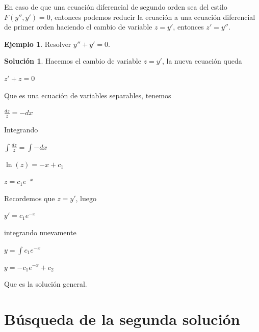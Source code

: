\documentclass{article}
\theoremstyle{plain}
\theoremstyle{definition}
\newtheorem{ejem}[thm]{Ejemplo}
\newtheorem{sol}[thm]{Solución}
\begin{document}
En caso de que una ecuación diferencial de segundo orden sea del estilo $F(y'',y')=0$, entonces podemos reducir la ecuación a una ecuación diferencial de primer orden haciendo el cambio de variable $z=y'$, entonces $z'=y''$.\\

\begin{ejem}Resolver $y''+y'=0$. \\
\end{ejem}

\begin{sol}Hacemos el cambio de variable $z=y'$, la nueva ecuación queda
\end{sol}

\begin{center}
$z'+z = 0$
\end{center}

Que es una ecuación de variables separables, tenemos

\begin{center}
$\displaystyle \frac{dz}{z} = -dx$
\end{center}

Integrando

\begin{center}
$\displaystyle  \int \frac{dz}{z} = \int -dx$
\end{center}


\begin{center}
$\displaystyle \ln(z) = -x +c_1$
\end{center}

\begin{center}
$\displaystyle z = c_1 e^{-x}$
\end{center}

Recordemos que $z= y'$, luego

\begin{center}
$\displaystyle y' = c_1 e^{-x}$
\end{center}

integrando nuevamente

\begin{center}
$\displaystyle y =  \int c_1 e^{-x}$
\end{center}

\begin{center}
$\displaystyle y =  -c_1e^{-x} +c_2$
\end{center}

Que es la solución general.


\newpage

\section{Búsqueda de la segunda solución}
\end{document}
